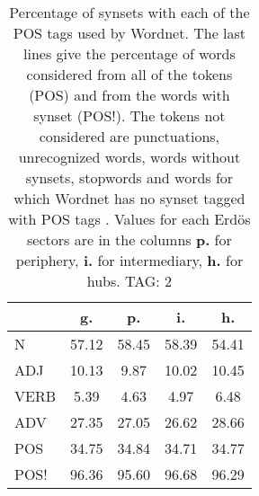 \begin{table}[h!]
\begin{center}
\begin{tabular}{| l || c | c | c | c |}\hline
 & {\bf g.} & {\bf p.} & {\bf i.} & {\bf h.} \\\hline\hline
N & 57.12  & 58.45  & 58.39  & 54.41 \\\hline
ADJ & 10.13  & 9.87  & 10.02  & 10.45 \\\hline
VERB & 5.39  & 4.63  & 4.97  & 6.48 \\\hline
ADV & 27.35  & 27.05  & 26.62  & 28.66 \\\hline\hline
POS & 34.75  & 34.84  & 34.71  & 34.77 \\\hline
POS! & 96.36  & 95.60  & 96.68  & 96.29 \\\hline
\end{tabular}
\caption{Percentage of synsets with each of the POS tags used by Wordnet. The last lines give the percentage of words considered from all of the tokens (POS) and from the words with synset (POS!). The tokens not considered are punctuations, unrecognized words, words without synsets, stopwords and words for which Wordnet has no synset  tagged with POS tags . Values for each Erd\"os sectors are in the columns {{\bf p.}} for periphery, {{\bf i.}} for intermediary, {{\bf h.}} for hubs. TAG: 2}
\end{center}
\end{table}